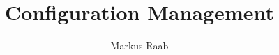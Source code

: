 
\makeatletter
\def\th@task{%
    \normalfont %
    \setbeamercolor{block title example}{bg=orange,fg=white}
    \setbeamercolor{block body example}{bg=orange!20,fg=black}
    \def\inserttheoremblockenv{exampleblock}
  }
\makeatother

\theoremstyle{task}
\newtheorem{task}{Task}

\newenvironment{assignment}%
{%
 \setbeamercolor{frametitle}{bg=orange,fg=white}
\begin{frame}}%
{\end{frame}}%





\pgfplotsset{compat=1.14}

\author{Markus Raab}

\title[Configuration Management \hspace{25mm} \insertframenumber/\inserttotalframenumber]{Configuration Management}

